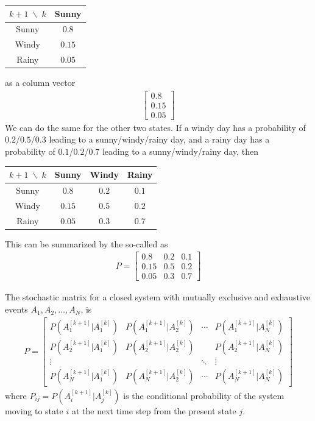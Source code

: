 \begin{center}
\begin{tabular}{|c|c|}
\hline
$k+1 \; \backslash \; k$ & Sunny \\
\hline
Sunny & $0.8$ \\
\hline
Windy & $0.15$ \\
\hline 
Rainy & $0.05$ \\
\hline
\end{tabular}
\end{center}
as a column vector
\begin{align*}
\begin{bmatrix}
0.8 \\
0.15 \\
0.05
\end{bmatrix}
\end{align*}
We can do the same for the other two states. If a windy day has a probability of $0.2$/$0.5$/$0.3$ leading to a sunny/windy/rainy day, and a rainy day has a probability of $0.1$/$0.2$/$0.7$ leading to a sunny/windy/rainy day, then
\begin{center}
\begin{tabular}{|c|c|c|c|}
\hline
$k+1 \; \backslash \; k$ & Sunny & Windy & Rainy \\
\hline
Sunny & $0.8$ & $0.2$ & $0.1$\\
\hline
Windy & $0.15$ & $0.5$ & $0.2$ \\
\hline 
Rainy & $0.05$ & $0.3$ & $0.7$ \\
\hline
\end{tabular}
\end{center}
This can be summarized by the so-called  as
\begin{align*}
P = 
\begin{bmatrix}
0.8 & 0.2 & 0.1\\
0.15 & 0.5 & 0.2 \\
0.05 & 0.3 & 0.7
\end{bmatrix}
\end{align*}
\begin{defn}
\label{defn:stocmat}
The stochastic matrix for a closed system with mutually exclusive and exhaustive events $A_1, A_2, \ldots, A_N$, is
\begin{align}
P =
\begin{bmatrix}
P(A_1^{[k+1]}|A_1^{[k]}) & P(A_1^{[k+1]}|A_2^{[k]}) & \cdots & P(A_1^{[k+1]}|A_N^{[k]})\\
P(A_2^{[k+1]}|A_1^{[k]}) & P(A_2^{[k+1]}|A_2^{[k]}) & & P(A_2^{[k+1]}|A_N^{[k]}) \\
\vdots & & \ddots & \vdots \\
P(A_N^{[k+1]}|A_1^{[k]}) & P(A_N^{[k+1]}|A_2^{[k]}) & \cdots & P(A_N^{[k+1]}|A_N^{[k]})
\end{bmatrix}
\label{eqn:stocP}
\end{align}
where $P_{ij} = P(A_i^{[k+1]}|A_j^{[k]})$ is the conditional probability of the system moving to state $i$ at the next time step from the present state $j$.
\end{defn}
